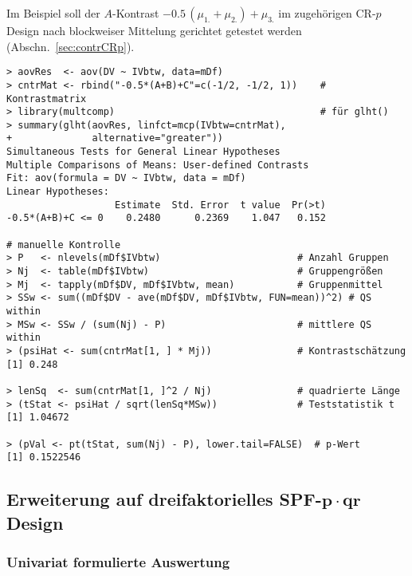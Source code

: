 Im Beispiel soll der $A$-Kontrast $-0.5 \, (\mu_{1.} + \mu_{2.}) + \mu_{3.}$ im zugehörigen CR-$p$ Design nach blockweiser Mittelung gerichtet getestet werden (Abschn.\ \ref{sec:contrCRp}).
\begin{lstlisting}
> aovRes  <- aov(DV ~ IVbtw, data=mDf)
> cntrMat <- rbind("-0.5*(A+B)+C"=c(-1/2, -1/2, 1))    # Kontrastmatrix
> library(multcomp)                                    # für glht()
> summary(glht(aovRes, linfct=mcp(IVbtw=cntrMat),
+              alternative="greater"))
Simultaneous Tests for General Linear Hypotheses
Multiple Comparisons of Means: User-defined Contrasts
Fit: aov(formula = DV ~ IVbtw, data = mDf)
Linear Hypotheses:
                   Estimate  Std. Error  t value  Pr(>t)
-0.5*(A+B)+C <= 0    0.2480      0.2369    1.047   0.152

# manuelle Kontrolle
> P   <- nlevels(mDf$IVbtw)                        # Anzahl Gruppen
> Nj  <- table(mDf$IVbtw)                          # Gruppengrößen
> Mj  <- tapply(mDf$DV, mDf$IVbtw, mean)           # Gruppenmittel
> SSw <- sum((mDf$DV - ave(mDf$DV, mDf$IVbtw, FUN=mean))^2) # QS within
> MSw <- SSw / (sum(Nj) - P)                       # mittlere QS within
> (psiHat <- sum(cntrMat[1, ] * Mj))               # Kontrastschätzung
[1] 0.248

> lenSq  <- sum(cntrMat[1, ]^2 / Nj)               # quadrierte Länge
> (tStat <- psiHat / sqrt(lenSq*MSw))              # Teststatistik t
[1] 1.04672

> (pVal <- pt(tStat, sum(Nj) - P), lower.tail=FALSE)  # p-Wert
[1] 0.1522546
\end{lstlisting}

\subsection[Erweiterung auf dreifaktorielles SPF-\texorpdfstring{$p \cdot qr$}{p.qr} Design]{Erweiterung auf dreifaktorielles SPF-$\bm{p \cdot qr}$ Design}

\subsubsection{Univariat formulierte Auswertung}

